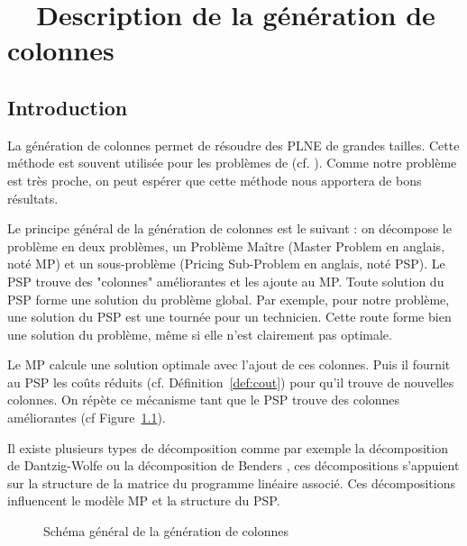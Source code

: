 
\chapter{~~Description de la génération de colonnes \label{gencol}}

\section{Introduction}


La génération de colonnes permet de résoudre des PLNE de grandes tailles. Cette méthode est souvent utilisée pour les problèmes de \vrptw (cf. \cite{feillet2010}). Comme notre problème est très proche, on peut espérer que cette méthode nous apportera de bons résultats. 

Le principe général de la génération de colonnes \cite{barnhart1998branch,feillet2010} est le suivant : on décompose le problème en deux problèmes, un Problème Maître (Master Problem en anglais, noté MP) et un sous-problème (Pricing Sub-Problem  en anglais, noté PSP).
Le PSP trouve des "colonnes" améliorantes et les ajoute au MP.
Toute solution du PSP forme une solution du problème global. 
Par exemple, pour notre problème, une solution du PSP est une tournée pour un technicien. 
Cette route forme bien une solution du problème, même si elle n'est clairement pas optimale.

Le MP calcule une solution optimale avec l'ajout de ces colonnes. 
Puis il fournit au PSP les coûts réduits (cf. Définition~\ref{def:cout}) pour qu'il trouve de nouvelles colonnes.
On répète ce mécanisme tant que le PSP trouve des colonnes améliorantes (cf Figure~\ref{fig:gencol}).

Il existe plusieurs types de décomposition comme par exemple la décomposition de Dantzig-Wolfe \cite{dantzig1960decomposition} ou la décomposition de Benders \cite{benders1962partitioning}, ces décompositions s'appuient sur la structure de la matrice du programme linéaire associé. Ces décompositions influencent le modèle MP et la structure du PSP.

\begin{figure}[H]
\caption{Schéma général de la génération de colonnes \label{fig:gencol}}
\end{figure}

